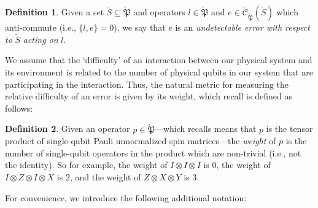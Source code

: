 \documentclass[12pt]{amsbook}
\theoremstyle{plain}
\theoremstyle{definition}
\newtheorem{definition}{Definition}
\theoremstyle{remark}
\newcommand{\set}{\tilde}
\newcommand{\pauligroup}{{\set{\mathfrak{P}}}}
\newcommand{\centralizer}{\set{\mathcal{C}}}
\begin{document}
\begin{definition}
Given a set $\set S\subseteq\pauligroup$ and operators $l\in\pauligroup$ and $e\in\centralizer_\pauligroup(\set S)$ which anti-commute (i.e., $\{l,e\}=0$), we say that $e$ is an \emph{undetectable error with respect to} $\set S$ \emph{acting on} $l$.
\end{definition}
We assume that the `difficulty' of an interaction between our physical system and its environment is related to the number of physical qubits in our system that are participating in the interaction.  Thus, the natural metric for measuring the relative difficulty of an error is given by its weight, which recall is defined as follows:

\begin{definition}
Given an operator $p\in\pauligroup$---which recalls means that $p$ is the tensor product of single-qubit Pauli unnormalized spin matrices---the \emph{weight} of $p$ is the number of single-qubit operators in the product which are non-trivial (i.e., not the identity).  So for example, the weight of $I\otimes I\otimes I$ is 0, the weight of $I\otimes Z\otimes I\otimes X$ is 2, and the weight of $Z\otimes X\otimes Y$ is 3.
\end{definition}
For convenience, we introduce the following additional notation:
\end{document}
